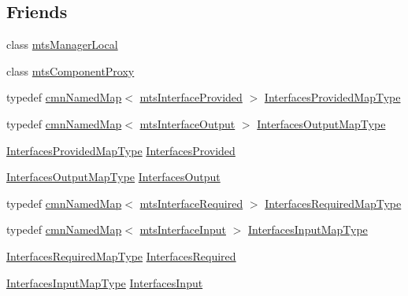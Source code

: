 \subsection*{Friends}
\begin{DoxyCompactItemize}
\item 
class \hyperlink{classmts_component_a31c1c611dbb103ac58ed40d84960baa0}{mts\+Manager\+Local}
\item 
class \hyperlink{classmts_component_a744ae66bbeeeba6ef38e59a2dd5e9743}{mts\+Component\+Proxy}
\end{DoxyCompactItemize}
\begin{DoxyCompactItemize}
\item 
typedef \hyperlink{classcmn_named_map}{cmn\+Named\+Map}$<$ \hyperlink{classmts_interface_provided}{mts\+Interface\+Provided} $>$ \hyperlink{classmts_component_a1d4117bf122737abe5f943a7ce057ff6}{Interfaces\+Provided\+Map\+Type}
\item 
typedef \hyperlink{classcmn_named_map}{cmn\+Named\+Map}$<$ \hyperlink{classmts_interface_output}{mts\+Interface\+Output} $>$ \hyperlink{classmts_component_afa3bfa3828ea8532dbbca641006e9589}{Interfaces\+Output\+Map\+Type}
\item 
\hyperlink{classmts_component_a1d4117bf122737abe5f943a7ce057ff6}{Interfaces\+Provided\+Map\+Type} \hyperlink{classmts_component_ae8842384f42ea5f46b1f39c3e8eddb36}{Interfaces\+Provided}
\item 
\hyperlink{classmts_component_afa3bfa3828ea8532dbbca641006e9589}{Interfaces\+Output\+Map\+Type} \hyperlink{classmts_component_a104e4fc2443e8f15304027701a9c1a8c}{Interfaces\+Output}
\end{DoxyCompactItemize}
\begin{DoxyCompactItemize}
\item 
typedef \hyperlink{classcmn_named_map}{cmn\+Named\+Map}$<$ \hyperlink{classmts_interface_required}{mts\+Interface\+Required} $>$ \hyperlink{classmts_component_aa3264a5cc739bccecbb58e5095bdd696}{Interfaces\+Required\+Map\+Type}
\item 
typedef \hyperlink{classcmn_named_map}{cmn\+Named\+Map}$<$ \hyperlink{classmts_interface_input}{mts\+Interface\+Input} $>$ \hyperlink{classmts_component_adfb95e70effe37bd6e8a66388cc9c9ed}{Interfaces\+Input\+Map\+Type}
\item 
\hyperlink{classmts_component_aa3264a5cc739bccecbb58e5095bdd696}{Interfaces\+Required\+Map\+Type} \hyperlink{classmts_component_a41da426dbdbe602272c9ab0d8958bfd4}{Interfaces\+Required}
\item 
\hyperlink{classmts_component_adfb95e70effe37bd6e8a66388cc9c9ed}{Interfaces\+Input\+Map\+Type} \hyperlink{classmts_component_a64fd1c940ac3672259a942ecbaaf40be}{Interfaces\+Input}
\end{DoxyCompactItemize}


